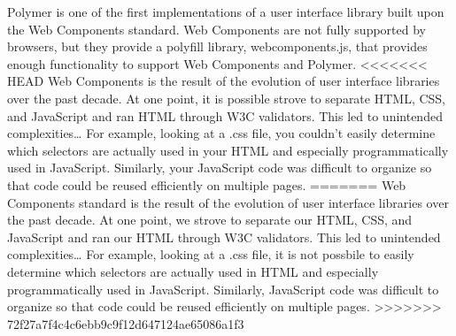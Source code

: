 Polymer is one of the first implementations of a user interface library built upon the Web Components standard.  Web Components are not fully supported by browsers, but they provide a polyfill library, webcomponents.js, that provides enough functionality to support Web Components and Polymer.
<<<<<<< HEAD
Web Components is the result of the evolution of user interface libraries over the past decade.  At one point, it is possible strove to separate HTML, CSS, and JavaScript and ran HTML through W3C validators. This led to unintended complexities…  For example, looking at a .css file, you couldn’t easily determine which selectors are actually used in your HTML and especially programmatically used in JavaScript.  Similarly, your JavaScript code was difficult to organize so that code could be reused efficiently on multiple pages.\cite{tch_polymer2}
=======
Web Components standard is the result of the evolution of user interface libraries over the past decade.  At one point, we strove to separate our HTML, CSS, and JavaScript and ran our HTML through W3C validators. This led to unintended complexities…  For example, looking at a .css file, it is not possbile to easily determine which selectors are actually used in HTML and especially programmatically used in JavaScript.  Similarly, JavaScript code was difficult to organize so that code could be reused efficiently on multiple pages.\cite{tch_polymer2}
>>>>>>> 72f27a7f4c4c6ebb9c9f12d647124ae65086a1f3
